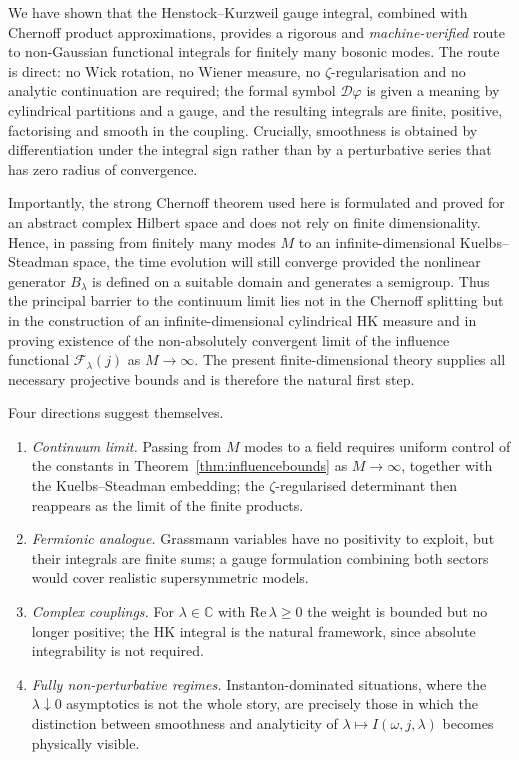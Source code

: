 \documentclass[11pt,a4paper]{article}
\theoremstyle{plain}
\theoremstyle{definition}
\theoremstyle{remark}
\newcommand{\dphi}{\mathcal{D}\varphi}
\newcommand{\C}{\mathbb{C}}
\begin{document}
We have shown that the Henstock--Kurzweil gauge integral, combined with Chernoff product
approximations, provides a rigorous and \emph{machine-verified} route to non-Gaussian
functional integrals for finitely many bosonic modes. The route is direct: no Wick
rotation, no Wiener measure, no $\zeta$-regularisation and no analytic continuation are
required; the formal symbol $\dphi$ is given a meaning by cylindrical partitions and a
gauge, and the resulting integrals are finite, positive, factorising and smooth in the
coupling. Crucially, smoothness is obtained by differentiation under the integral sign
rather than by a perturbative series that has zero radius of convergence.

Importantly, the strong Chernoff theorem used here is formulated and proved for an
abstract complex Hilbert space and does not rely on finite dimensionality. Hence, in
passing from finitely many modes \(M\) to an infinite-dimensional Kuelbs--Steadman space,
the time evolution will still converge provided the nonlinear generator \(B_\lambda\) is
defined on a suitable domain and generates a semigroup. Thus the principal barrier to the
continuum limit lies not in the Chernoff splitting but in the construction of an
infinite-dimensional cylindrical HK measure and in proving existence of the
non-absolutely convergent limit of the influence functional \(\mathcal{F}_\lambda(j)\)
as \(M\to\infty\). The present finite-dimensional theory supplies all necessary
projective bounds and is therefore the natural first step.

Four directions suggest themselves.

\begin{enumerate}
\item \emph{Continuum limit.} Passing from $M$ modes to a field requires uniform control
of the constants in Theorem~\ref{thm:influencebounds} as $M\to\infty$, together with the
Kuelbs--Steadman embedding; the $\zeta$-regularised determinant then reappears as the
limit of the finite products.
\item \emph{Fermionic analogue.} Grassmann variables have no positivity to exploit, but
their integrals are finite sums; a gauge formulation combining both sectors would cover
realistic supersymmetric models.
\item \emph{Complex couplings.} For $\lambda\in\C$ with $\mathrm{Re}\,\lambda\ge0$ the
weight is bounded but no longer positive; the HK integral is the natural framework, since
absolute integrability is not required.
\item \emph{Fully non-perturbative regimes.} Instanton-dominated situations, where the
$\lambda\downarrow 0$ asymptotics is not the whole story, are precisely those in which the
distinction between smoothness and analyticity of $\lambda\mapsto I(\omega,j,\lambda)$
becomes physically visible.
\end{enumerate}
\end{document}
